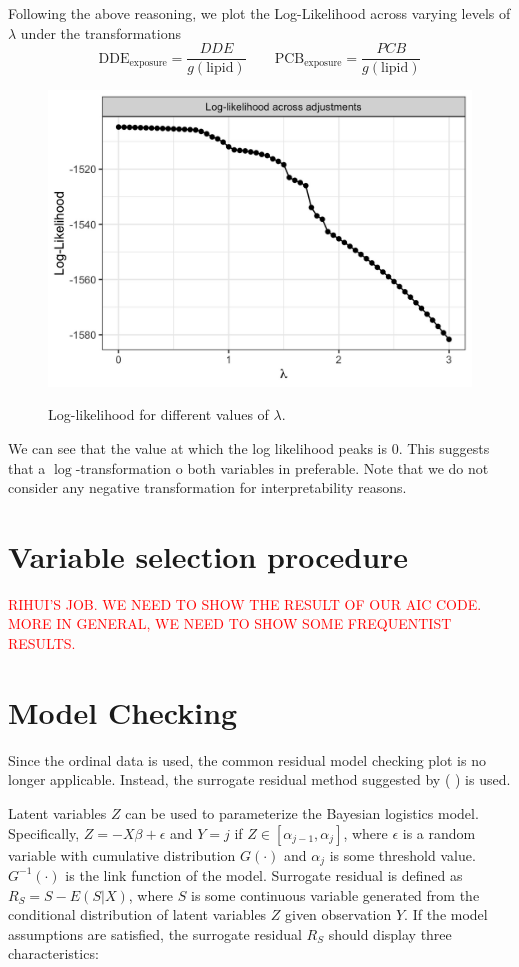 \documentclass[10pt]{jmlr}%
\begin{document}
Following the above reasoning, we plot the Log-Likelihood across varying levels of $\lambda$  under the transformations
\begin{equation}
\textrm{DDE}_{\text{exposure}} = \frac{DDE}{g(\text{lipid})} \qquad \textrm{PCB}_{\text{exposure}} = \frac{PCB}{g(\text{lipid})}
\end{equation}


\begin{figure}[htbp]
	\centering
	\caption{Log-likelihood for different values of $\lambda$.}
	\includegraphics[width=0.7\linewidth]{BocCox}
	\label{fig:boxcox}
\end{figure}

We can see that the value at which the log likelihood peaks is 0. This suggests that a $\log$-transformation o  both variables in preferable. Note that we do not consider any negative transformation for interpretability reasons. 



\section{Variable selection procedure}
\textcolor{red}{RIHUI'S JOB. WE NEED TO SHOW THE RESULT OF OUR AIC CODE. MORE IN GENERAL, WE NEED TO SHOW SOME FREQUENTIST RESULTS.}

\section{Model Checking}

Since the ordinal data is used, the common residual model checking plot is no longer applicable. Instead, the surrogate residual method suggested by (%
) is used. 

Latent variables $Z$ can be used to parameterize the Bayesian logistics model. Specifically, $Z=-X\beta+\epsilon$ and $Y=j$ if $Z\in[\alpha_{j-1},\alpha_{j}]$, where $\epsilon$ is a random variable with cumulative distribution $G(\cdot)$ and $\alpha_{j}$ is some threshold value. $G^{-1}(\cdot)$ is the link function of the model. Surrogate residual is defined as $R_S=S-E(S|X)$, where $S$ is some continuous variable generated from the conditional distribution of latent variables $Z$ given observation $Y$. If the model assumptions are satisfied, the surrogate residual $R_S$ should display three characteristics: 
\end{document}
